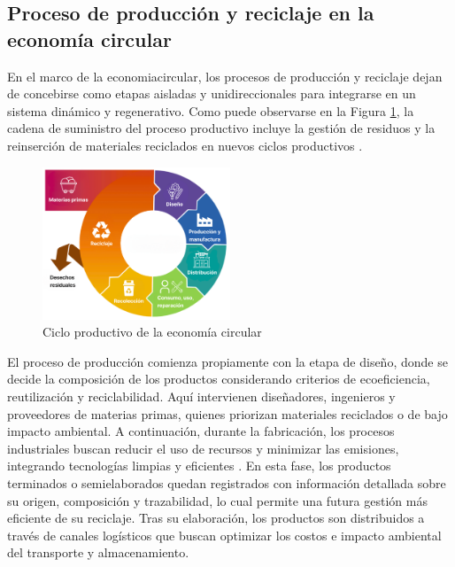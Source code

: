 \subsection{Proceso de producción y reciclaje en la economía circular}

En el marco de la \gls{economiacircular}, los procesos de producción y reciclaje dejan de concebirse como etapas aisladas y unidireccionales para integrarse en un sistema dinámico y regenerativo. Como puede observarse en la Figura \ref{fig:circular-economy-stages}, la cadena de suministro del proceso productivo incluye la gestión de residuos y la reinserción de materiales reciclados en nuevos ciclos productivos \cite{cepal2021economia}.

\begin{figure}[!tb]
    \centering
    \includegraphics[width=0.5\textwidth]{Figures/circular-economy-stages.png}
    \caption{Ciclo productivo de la economía circular}
    \label{fig:circular-economy-stages}
\end{figure}

El proceso de producción comienza propiamente con la etapa de diseño, donde se decide la composición de los productos considerando criterios de ecoeficiencia, reutilización y reciclabilidad. Aquí intervienen diseñadores, ingenieros y proveedores de materias primas, quienes priorizan materiales reciclados o de bajo impacto ambiental. A continuación, durante la fabricación, los procesos industriales buscan reducir el uso de recursos y minimizar las emisiones, integrando tecnologías limpias y eficientes \cite{espanacircular2030}. En esta fase, los productos terminados o semielaborados quedan registrados con información detallada sobre su origen, composición y trazabilidad, lo cual permite una futura gestión más eficiente de su reciclaje. Tras su elaboración, los productos son distribuidos a través de canales logísticos que buscan optimizar los costos e impacto ambiental del transporte y almacenamiento.

